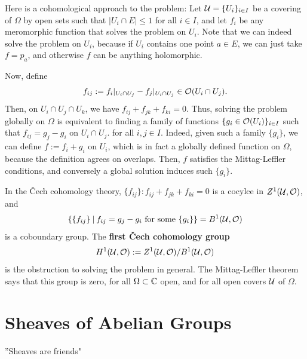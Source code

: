 \documentclass[11pt]{article}
\begin{document}
Here is a cohomological approach to the problem: Let $\mathcal U=\{U_i\}_{i \in I}$ be a covering of $\Omega$ by open sets such that $|U_i \cap E| \leq 1$ for all $i \in I$, and let $f_i$ be any meromorphic function that solves the problem on $U_i$. Note that we can indeed solve the problem on $U_i$, because if $U_i$ contains one point $a \in E$, we can just take $f=p_a$, and otherwise $f$ can be anything holomorphic.

Now, define
$$f_{ij}:=f_i|_{U_i \cap U_j} - f_j|_{U_i \cap U_j} \in \mathcal O(U_i \cap U_j).$$
Then, on $U_i \cap U_j \cap U_k$, we have $f_{ij}+f_{jk}+f_{ki}=0$. Thus, solving the problem globally on $\Omega$ is equivalent to finding a family of functions $\{g_i \in \mathcal O(U_i)\}_{i \in I}$ such that $f_{ij}=g_j-g_i$ on $U_i \cap U_j$. for all $i,j \in I$. Indeed, given such a family $\{g_i\}$, we can define $f:= f_i+g_i$ on $U_i$, which is in fact a globally defined function on $\Omega$, because the definition agrees on overlaps. Then, $f$ satisfies the Mittag-Leffler conditions, and conversely a global solution induces such $\{g_i\}$.

In the \v{C}ech cohomology theory, $\{f_{ij}\} : f_{ij}+ f_{jk}+f_{ki}=0$ is a cocylce in $Z^1(\mathcal U,\mathcal O)$, and
$$\left \{ \{f_{ij}\} \: \middle |\: f_{ij}=g_j-g_i \text{ for some } \{g_i\}   \right \}=B^1(\mathcal U,\mathcal O)$$
is a coboundary group. The \textbf{first \v{C}ech cohomology group}
$$H^1(\mathcal U,\mathcal O):=Z^1(\mathcal U,\mathcal O)/B^1 (\mathcal U,\mathcal O)$$
is the obstruction to solving the problem in general. The Mittag-Leffler theorem says that this group is zero, for all $\Omega \subset \mathbb{C}$ open, and for all open covers $\mathcal U$ of $\Omega$.

\section{Sheaves of Abelian Groups}

''Sheaves are friends"
\end{document}
